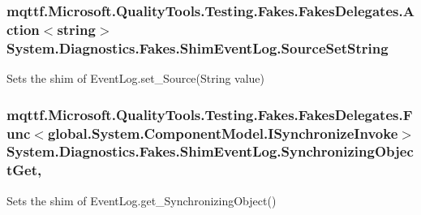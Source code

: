 \hypertarget{class_system_1_1_diagnostics_1_1_fakes_1_1_shim_event_log_ab09c98fb1797cdf543cbd35dadddd960}{
\subsubsection[{Source\-Set\-String}]{\setlength{\rightskip}{0pt plus 5cm}mqttf.\-Microsoft.\-Quality\-Tools.\-Testing.\-Fakes.\-Fakes\-Delegates.\-Action$<$string$>$ System.\-Diagnostics.\-Fakes.\-Shim\-Event\-Log.\-Source\-Set\-String\hspace{0.3cm}{\ttfamily [set]}}}\label{class_system_1_1_diagnostics_1_1_fakes_1_1_shim_event_log_ab09c98fb1797cdf543cbd35dadddd960}


Sets the shim of Event\-Log.\-set\-\_\-\-Source(\-String value)

\hypertarget{class_system_1_1_diagnostics_1_1_fakes_1_1_shim_event_log_af5a39eae25a50809788b977d737cebb0}{
\subsubsection[{Synchronizing\-Object\-Get}]{\setlength{\rightskip}{0pt plus 5cm}mqttf.\-Microsoft.\-Quality\-Tools.\-Testing.\-Fakes.\-Fakes\-Delegates.\-Func$<$global.\-System.\-Component\-Model.\-I\-Synchronize\-Invoke$>$ System.\-Diagnostics.\-Fakes.\-Shim\-Event\-Log.\-Synchronizing\-Object\-Get\hspace{0.3cm}{\ttfamily [get]}, {\ttfamily [set]}}}\label{class_system_1_1_diagnostics_1_1_fakes_1_1_shim_event_log_af5a39eae25a50809788b977d737cebb0}


Sets the shim of Event\-Log.\-get\-\_\-\-Synchronizing\-Object()

